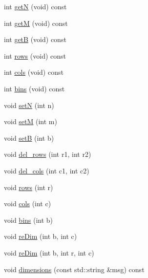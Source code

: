 \begin{DoxyCompactItemize}
\item 
int \mbox{\hyperlink{structSEMBLE_1_1SembleMatrix_a08e062d74d9de22f303e1ab957eb77f2}{getN}} (void) const
\item 
int \mbox{\hyperlink{structSEMBLE_1_1SembleMatrix_a26d2ee5bf9ad9cb0fdd30bce5abadf92}{getM}} (void) const
\item 
int \mbox{\hyperlink{structSEMBLE_1_1SembleMatrix_aecff047627ee656c5836dcdf873c8ad6}{getB}} (void) const
\item 
int \mbox{\hyperlink{structSEMBLE_1_1SembleMatrix_a89cbc720521103b2a30228a3ca3b1e03}{rows}} (void) const
\item 
int \mbox{\hyperlink{structSEMBLE_1_1SembleMatrix_af0d467ec8fe85b4947556ad5d25bcda0}{cols}} (void) const
\item 
int \mbox{\hyperlink{structSEMBLE_1_1SembleMatrix_af79972f16dd8874677ed61b5bfdc7ed3}{bins}} (void) const
\item 
void \mbox{\hyperlink{structSEMBLE_1_1SembleMatrix_abd156f95830c6b27aac722d4346901cc}{setN}} (int n)
\item 
void \mbox{\hyperlink{structSEMBLE_1_1SembleMatrix_acbb4c25efd64633247fc6119a0d427ca}{setM}} (int m)
\item 
void \mbox{\hyperlink{structSEMBLE_1_1SembleMatrix_a3efa5315ec7e5fd9491e5904479c82ec}{setB}} (int b)
\item 
void \mbox{\hyperlink{structSEMBLE_1_1SembleMatrix_a648b1088d29de6b44ca6508492939b42}{del\+\_\+rows}} (int r1, int r2)
\item 
void \mbox{\hyperlink{structSEMBLE_1_1SembleMatrix_a6e73d380227b99dd131a8c39742734a0}{del\+\_\+cols}} (int c1, int c2)
\item 
void \mbox{\hyperlink{structSEMBLE_1_1SembleMatrix_aa489bc3fac488706d97e78519e7334df}{rows}} (int r)
\item 
void \mbox{\hyperlink{structSEMBLE_1_1SembleMatrix_a06252460e771d092f72f9d7dfee55084}{cols}} (int c)
\item 
void \mbox{\hyperlink{structSEMBLE_1_1SembleMatrix_ae3efc835049db0182eaf149bcbf9d142}{bins}} (int b)
\item 
void \mbox{\hyperlink{structSEMBLE_1_1SembleMatrix_a376b3b7cc061b6d20370cb78ade11b0e}{re\+Dim}} (int b, int c)
\item 
void \mbox{\hyperlink{structSEMBLE_1_1SembleMatrix_a9bb9814650ff3bd6c43656781811391b}{re\+Dim}} (int b, int r, int c)
\item 
void \mbox{\hyperlink{structSEMBLE_1_1SembleMatrix_ab778c582ca37ce69f2f9ab1074af0ca6}{dimensions}} (const std\+::string \&msg) const

\end{DoxyCompactItemize}
